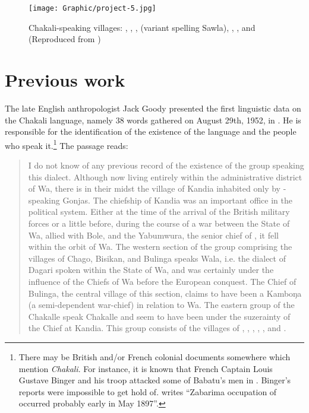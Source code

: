 \begin{sidewaysfigure}
 \centering

\texttt{[image: Graphic/project-5.jpg]}

\caption[]{Chakali-speaking villages: ,
, ,  (variant spelling Sawla), , , and   (Reproduced from \citet{brin16})\label{fig:map-b-and-w}}
\end{sidewaysfigure}

\newpage 
\section{Previous work}
\label{sec:chrono}


The late English anthropologist Jack Goody presented the first linguistic data on the Chakali language, namely 38 words gathered  on August 29th, 1952,  in  \citep[33]{Good54}. He is responsible for the identification of the existence of the language and the people who speak it.\footnote{There may be British and/or French colonial documents somewhere which mention {\it Chakali}. For instance,  it is known that French Captain  Louis Gustave Binger and his troop attacked some of Babatu's men in  .  Binger's reports were impossible to get hold of. \citet[133]{Wilk89} writes ``Zabarima occupation of  occurred probably early in May 1897''.} The passage reads: 

\begin{quote} I do not know of any previous record of the existence of the 
group speaking this dialect. Although now living entirely within the 
administrative district of Wa, there is in their midst the village of Kandia 
inhabited only by -speaking Gonjas. The chiefship of Kandia was an 
important office in the  political system. Either at the time of the 
arrival of the British military forces or a little before, during the course of 
a war between the State of Wa, allied with Bole, and the Yabumwura, the senior 
chief of , it fell within the orbit of Wa. The western section of the 
group comprising the villages of Chago, Bisikan, and Bulinga speaks Wala, i.e. the 
dialect of Dagari spoken within the State of Wa, and was certainly under the 
influence of the Chiefs of Wa before the European conquest. The Chief of 
Bulinga, the central village of this section, claims to have been a Kamboŋa (a 
semi-dependent war-chief) in relation to Wa. The eastern group of the Chakalle 
speak Chakalle and seem to have been under the suzerainty of the  Chief at 
Kandia. This group consists of the villages of , , , , 
,  and . \citep[3]{Good54} 
\end{quote}

